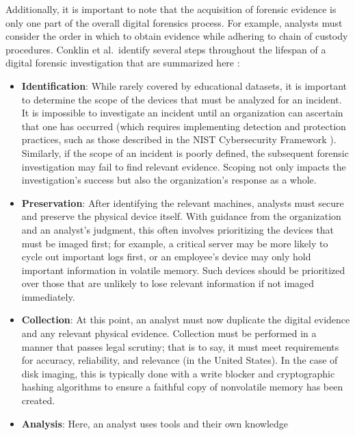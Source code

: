 \documentclass[letterpaper,12pt]{report}
\def\tightlist{}
\begin{document}
Additionally, it is important to note that the acquisition of forensic
evidence is only one part of the overall digital forensics process. For
example, analysts must consider the order in which to obtain evidence
while adhering to chain of custody procedures. Conklin et al.~identify
several steps throughout the lifespan of a digital forensic
investigation that are summarized here
\cite{conklinComputerForensics2022}:

\begin{itemize}
\tightlist
\item
  \textbf{Identification}: While rarely covered by educational datasets,
  it is important to determine the scope of the devices that must be
  analyzed for an incident. It is impossible to investigate an incident
  until an organization can ascertain that one has occurred (which
  requires implementing detection and protection practices, such as
  those described in the NIST Cybersecurity Framework
  \cite{nationalinstituteofstandardsandtechnologyNISTCybersecurityFramework2024}).
  Similarly, if the scope of an incident is poorly defined, the
  subsequent forensic investigation may fail to find relevant evidence.
  Scoping not only impacts the investigation's success but also the
  organization's response as a whole.
\item
  \textbf{Preservation}: After identifying the relevant machines,
  analysts must secure and preserve the physical device itself. With
  guidance from the organization and an analyst's judgment, this often
  involves prioritizing the devices that must be imaged first; for
  example, a critical server may be more likely to cycle out important
  logs first, or an employee's device may only hold important
  information in volatile memory. Such devices should be prioritized
  over those that are unlikely to lose relevant information if not
  imaged immediately.
\item
  \textbf{Collection}: At this point, an analyst must now duplicate the
  digital evidence and any relevant physical evidence. Collection must
  be performed in a manner that passes legal scrutiny; that is to say,
  it must meet requirements for accuracy, reliability, and relevance
  \cite{conklinComputerForensics2022,garfinkelBringingScienceDigital2009}
  (in the United States). In the case of disk imaging, this is typically
  done with a write blocker and cryptographic hashing algorithms to
  ensure a faithful copy of nonvolatile memory has been created.
\item
  \textbf{Analysis}: Here, an analyst uses tools and their own knowledge

\end{itemize}
\end{document}
